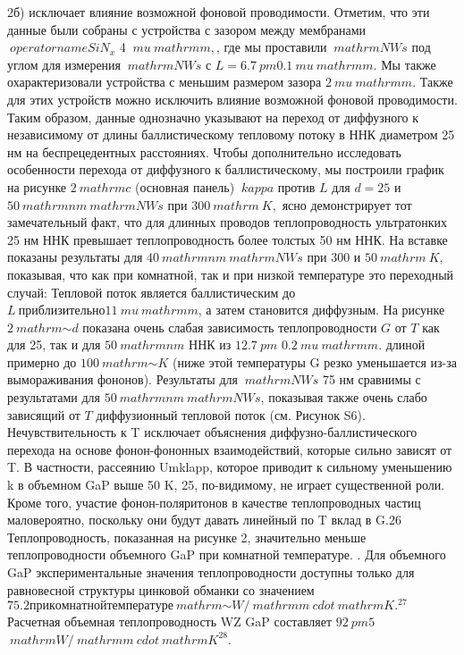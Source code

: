 \documentclass[a4paper, 12pt]{article}%
\begin{document}
2б) исключает влияние возможной фоновой проводимости. Отметим, что эти данные были собраны с устройства с зазором между мембранами $ \ operatorname {SiN} _ {x} $ 4 $ \ mu \ mathrm {m}, $, где мы проставили $ \ mathrm {NWs } $ под углом для измерения $ \ mathrm {NWs} $ с $ L = 6.7 \ pm 0.1 \ mu \ mathrm {m}. $ Мы также охарактеризовали устройства с меньшим размером зазора $ 2 \ mu \ mathrm {m} $. Также для этих устройств можно исключить влияние возможной фоновой проводимости. Таким образом, данные однозначно указывают на переход от диффузного к независимому от длины баллистическому тепловому потоку в ННК диаметром 25 нм на беспрецедентных расстояниях. Чтобы дополнительно исследовать особенности перехода от диффузного к баллистическому, мы построили график на рисунке $ 2 \ mathrm {c} $ (основная панель) $ \ kappa $ против $ L $ для $ d = 25 $ и $ 50 \ mathrm {nm} \ mathrm {NWs} $ при $ 300 \ mathrm {~ K}, $ ясно демонстрирует тот замечательный факт, что для длинных проводов теплопроводность ультратонких 25 нм ННК превышает теплопроводность более толстых 50 нм ННК. На вставке показаны результаты для $ 40 \ mathrm {nm} \ mathrm {NWs} $ при 300 и $ 50 \ mathrm {~ K} $, показывая, что как при комнатной, так и при низкой температуре это переходный случай:
Тепловой поток является баллистическим до $ L \ приблизительно 11 \ mu \ mathrm {m} $, а затем становится диффузным. На рисунке $ 2 \ mathrm {\sim d} $ показана очень слабая зависимость теплопроводности $ G $ от $ T $ как для 25, так и для $ 50 \ mathrm {nm} $ ННК из $ 12.7 \ pm $ $ 0.2 \ mu \ mathrm {m} $. длиной примерно до $ 100 \ mathrm {\sim K} $ (ниже этой температуры G резко уменьшается из-за вымораживания фононов). Результаты для $ \ mathrm {NWs} $ 75 нм сравнимы с результатами для $ 50 \ mathrm {nm} \ mathrm {NWs} $, показывая также очень слабо зависящий от $ T $ диффузионный тепловой поток (см. Рисунок S6). Нечувствительность к T исключает объяснения диффузно-баллистического перехода на основе фонон-фононных взаимодействий, которые сильно зависят от T. В частности, рассеянию Umklapp, которое приводит к сильному уменьшению k в объемном GaP выше 50 K, 25, по-видимому, не играет существенной роли. Кроме того, участие фонон-поляритонов в качестве теплопроводных частиц маловероятно, поскольку они будут давать линейный по T вклад в G.26 Теплопроводность, показанная на рисунке 2, значительно меньше теплопроводности объемного GaP при комнатной температуре. . Для объемного GaP экспериментальные значения теплопроводности доступны только для равновесной структуры цинковой обманки со значением $ 75.2 при комнатной температуре \ mathrm {\sim W} / \ mathrm {m} \ cdot \ mathrm {K}. ^ {27} $ Расчетная объемная теплопроводность WZ GaP составляет $ 92 \ pm 5 $ $ \ mathrm {W} / \ mathrm {m} \ cdot \ mathrm {K} ^ {28} $.
\end{document}
